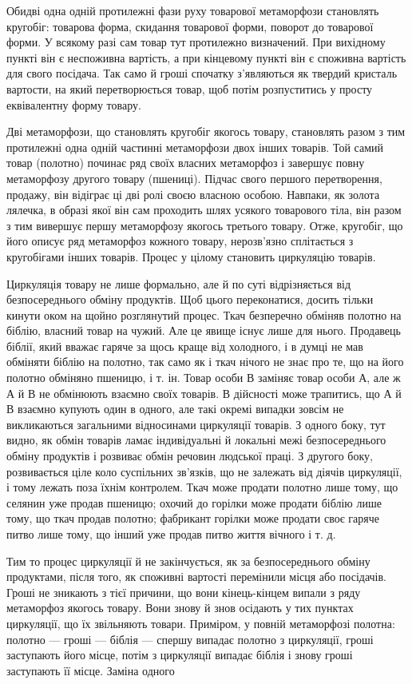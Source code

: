 Обидві одна одній протилежні фази руху товарової метаморфози
становлять кругобіг: товарова форма, скидання товарової
форми, поворот до товарової форми. У всякому разі сам товар
тут протилежно визначений. При вихідному пункті він є неспоживна
вартість, а при кінцевому пункті він є споживна вартість
для свого посідача. Так само й гроші спочатку з’являються як
твердий кристаль вартости, на який перетворюється товар, щоб
потім розпуститись у просту еквівалентну форму товару.

Дві метаморфози, що становлять кругобіг якогось товару,
становлять разом з тим протилежні одна одній частинні метаморфози
двох інших товарів. Той самий товар (полотно) починає ряд
своїх власних метаморфоз і завершує повну метаморфозу другого
товару (пшениці). Підчас свого першого перетворення, продажу,
він відіграє ці дві ролі своєю власною особою. Навпаки, як золота
лялечка, в образі якої він сам проходить шлях усякого товарового
тіла, він разом з тим вивершує першу метаморфозу якогось третього
товару. Отже, кругобіг, що його описує ряд метаморфоз
кожного товару, нерозв’язно сплітається з кругобігами інших
товарів. Процес у цілому становить циркуляцію товарів.

Циркуляція товару не лише формально, але й по суті відрізняється
від безпосереднього обміну продуктів. Щоб цього переконатися,
досить тільки кинути оком на щойно розглянутий процес.
Ткач безперечно обміняв полотно на біблію, власний товар на
чужий. Але це явище існує лише для нього. Продавець біблії,
який вважає гаряче за щось краще від холодного, і в думці не
мав обміняти біблію на полотно, так само як і ткач нічого не
знає про те, що на його полотно обміняно пшеницю, і т. ін. Товар
особи В заміняє товар особи А, але ж А й В не обмінюють взаємно
своїх товарів. В дійсності може трапитись, що А й В взаємно
купують один в одного, але такі окремі випадки зовсім не викликаються
загальними відносинами циркуляції товарів. З одного
боку, тут видно, як обмін товарів ламає індивідуальні й локальні
межі безпосереднього обміну продуктів і розвиває обмін
речовин людської праці. З другого боку, розвивається ціле коло
суспільних зв’язків, що не залежать від діячів циркуляції,
і тому лежать поза їхнім контролем. Ткач може продати полотно
лише тому, що селянин уже продав пшеницю; охочий до горілки
може продати біблію лише тому, що ткач продав полотно; фабрикант
горілки може продати своє гаряче питво лише тому, що інший
уже продав питво життя вічного і т. д.

Тим то процес циркуляції й не закінчується, як за безпосереднього
обміну продуктами, після того, як споживні вартості
перемінили місця або посідачів. Гроші не зникають з тієї причини,
що вони кінець-кінцем випали з ряду метаморфоз якогось
товару. Вони знову й знов осідають у тих пунктах циркуляції,
що їх звільняють товари. Приміром, у повній метаморфозі полотна:
полотно — гроші — біблія — спершу випадає полотно з
циркуляції, гроші заступають його місце, потім з циркуляції
випадає біблія і знову гроші заступають її місце. Заміна одного
\parbreak{}  %
